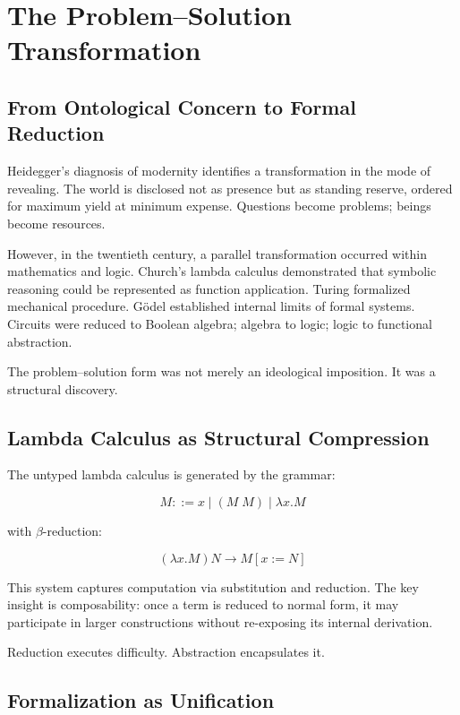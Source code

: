\documentclass[11pt,openany]{book}
\begin{document}
\mainmatter

\chapter{The Problem--Solution Transformation}

\section{From Ontological Concern to Formal Reduction}

Heidegger's diagnosis of modernity identifies a transformation in the mode of revealing.
The world is disclosed not as presence but as standing reserve, ordered for maximum yield 
at minimum expense. Questions become problems; beings become resources.

However, in the twentieth century, a parallel transformation occurred within mathematics and logic.
Church's lambda calculus demonstrated that symbolic reasoning could be represented as 
function application. Turing formalized mechanical procedure. Gödel established internal 
limits of formal systems. Circuits were reduced to Boolean algebra; algebra to logic; 
logic to functional abstraction.

The problem--solution form was not merely an ideological imposition.
It was a structural discovery.

\section{Lambda Calculus as Structural Compression}

The untyped lambda calculus is generated by the grammar:

\[
M ::= x \mid (M \; M) \mid \lambda x . M
\]

with $\beta$-reduction:

\[
(\lambda x . M) N \to M[x := N]
\]

This system captures computation via substitution and reduction.
The key insight is composability: once a term is reduced to normal form,
it may participate in larger constructions without re-exposing its internal derivation.

Reduction executes difficulty.
Abstraction encapsulates it.

\section{Formalization as Unification}
\end{document}

